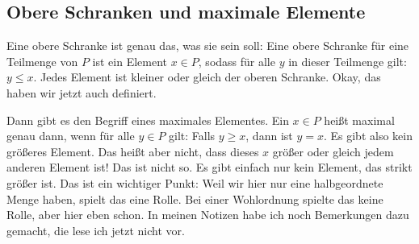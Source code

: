 \begin{math-stroke}


\end{math-stroke}

\subsection{Obere Schranken und maximale Elemente}

\begin{spoken-clean}[00:58:40 - 01:00:40]
Eine obere Schranke ist genau das, was sie sein soll: Eine obere Schranke für eine Teilmenge von $P$ ist ein Element $x \in P$, sodass für alle $y$ in dieser Teilmenge gilt: $y \le x$. Jedes Element ist kleiner oder gleich der oberen Schranke. Okay, das haben wir jetzt auch definiert.

Dann gibt es den Begriff eines maximales Elementes. Ein $x \in P$ heißt maximal genau dann, wenn für alle $y \in P$ gilt: Falls $y \ge x$, dann ist $y = x$. Es gibt also kein größeres Element. Das heißt aber nicht, dass dieses $x$ größer oder gleich jedem anderen Element ist! Das ist nicht so. Es gibt einfach nur kein Element, das strikt größer ist. Das ist ein wichtiger Punkt: Weil wir hier nur eine halbgeordnete Menge haben, spielt das eine Rolle. Bei einer Wohlordnung spielte das keine Rolle, aber hier eben schon. In meinen Notizen habe ich noch Bemerkungen dazu gemacht, die lese ich jetzt nicht vor.
\end{spoken-clean}

